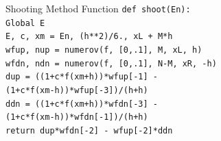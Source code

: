 \documentclass{beamer}
\begin{document}
\begin{frame}{Shooting Method Function} 
        {
        \texttt{def shoot(En):} \\
        \hspace{0.5cm} \texttt{Global E} \\
        \hspace{0.5cm} \texttt{E, c, xm = En, (h**2)/6., xL + M*h} \\
        \hspace{0.5cm} \texttt{wfup, nup = numerov(f, [0,.1], M, xL, h)} \\
        \hspace{0.5cm} \texttt{wfdn, ndn = numerov(f, [0,.1], N-M, xR, -h)} \\
        \hspace{0.5cm} \texttt{dup = ((1+c*f(xm+h))*wfup[-1] - \\
        \hspace{1.85cm} (1+c*f(xm-h))*wfup[-3])/(h+h)} \\
        \hspace{0.5cm} \texttt{ddn = ((1+c*f(xm+h))*wfdn[-3] - \\
        \hspace{1.85cm} (1+c*f(xm-h))*wfdn[-1])/(h+h)} \\
        \hspace{0.5cm} \texttt{return dup*wfdn[-2] - wfup[-2]*ddn} \\
        }
\end{frame}
\end{document}
